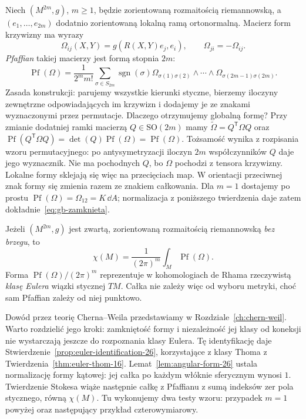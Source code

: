 Niech $(M^{2m},g)$, $m\geq1$, będzie zorientowaną rozmaitością
riemannowską, a $(e_1,\ldots,e_{2m})$ dodatnio zorientowaną
lokalną ramą ortonormalną. Macierz form krzywizny ma wyrazy
\[
 \Omega_{ij}(X,Y)=g(R(X,Y)e_j,e_i),\qquad
 \Omega_{ji}=-\Omega_{ij}.
\]
\emph{Pfaffian} takiej macierzy jest formą stopnia $2m$:
\begin{equation}\label{eq:gb-pfaff-def}
 \operatorname{Pf}(\Omega)=\frac1{2^m m!}
 \sum_{\sigma\in S_{2m}}\operatorname{sgn}(\sigma)
 \Omega_{\sigma(1)\sigma(2)}\wedge\cdots\wedge
 \Omega_{\sigma(2m-1)\sigma(2m)}.
\end{equation}
Zasada konstrukcji: parujemy wszystkie kierunki styczne,
bierzemy iloczyny zewnętrzne odpowiadających im krzywizn
i dodajemy je ze znakami wyznaczonymi przez permutacje.
Dlaczego otrzymujemy globalną formę? Przy zmianie dodatniej
ramki macierzą $Q\in\mathrm{SO}(2m)$ mamy
$\widetilde\Omega=Q^{\mathsf T}\Omega Q$ oraz
$\operatorname{Pf}(Q^{\mathsf T}\Omega Q)
=\det(Q)\operatorname{Pf}(\Omega)=\operatorname{Pf}(\Omega)$.
Tożsamość wynika z rozpisania wzoru permutacyjnego:
po antysymetryzacji iloczyn $2m$ współczynników $Q$
daje jego wyznacznik. Nie ma pochodnych $Q$, bo
$\Omega$ pochodzi z tensora krzywizny. Lokalne formy
sklejają się więc na przecięciach map.
W orientacji przeciwnej znak formy się zmienia razem
ze znakiem całkowania. Dla $m=1$ dostajemy po prostu
$\operatorname{Pf}(\Omega)=\Omega_{12}=K\,\dd A$;
normalizacja z poniższego twierdzenia daje zatem
dokładnie~\eqref{eq:gb-zamknieta}.

\begin{twierdzenie}
\label{thm:chern-gauss-bonnet}
Jeżeli $(M^{2m},g)$ jest zwartą, zorientowaną
rozmaitością riemannowską \emph{bez brzegu}, to
\begin{equation}\label{eq:chern-gauss-bonnet}
 \boxed{\displaystyle
 \chi(M)=\frac1{(2\pi)^m}\int_M
                       \operatorname{Pf}(\Omega).}
\end{equation}
Forma $\operatorname{Pf}(\Omega)/(2\pi)^m$ reprezentuje
w kohomologiach de Rhama rzeczywistą \emph{klasę Eulera}
wiązki stycznej $TM$. Całka nie zależy więc od wyboru
metryki, choć sam Pfaffian zależy od niej punktowo.
\end{twierdzenie}

Dowód przez teorię Cherna--Weila przedstawiamy w
Rozdziale~\ref{ch:chern-weil}. Warto rozdzielić jego kroki:
zamkniętość formy i niezależność jej klasy od koneksji
nie wystarczają jeszcze do rozpoznania klasy Eulera.
Tę identyfikację daje Stwierdzenie~\ref{prop:euler-identification-26},
korzystające z klasy Thoma z Twierdzenia~\ref{thm:euler-thom-16}.
Lemat~\ref{lem:angular-form-26} ustala normalizację formy kątowej:
jej całka po każdym włóknie sferycznym wynosi $1$.
Twierdzenie Stokesa wiąże następnie całkę z Pfaffianu
z sumą indeksów zer pola stycznego, równą $\chi(M)$.
Tu wykonujemy dwa testy wzoru: przypadek $m=1$ powyżej
oraz następujący przykład czterowymiarowy.

